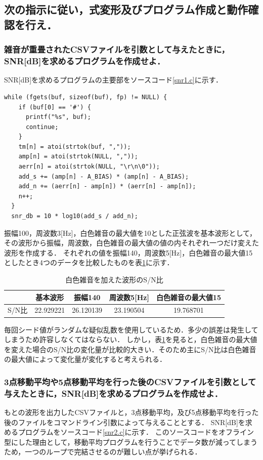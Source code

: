 \documentclass[titlepage]{jarticle}
\begin{document}
\subsection{次の指示に従い，式変形及びプログラム作成と動作確認を行え．}

\setcounter{subsubsection}{2}
\subsubsection{雑音が重畳されたCSVファイルを引数として与えたときに，SNR[dB]を求めるプログラムを作成せよ．}\label{snr1}
SNR[dB]を求めるプログラムの主要部をソースコード\ref{snr1.c}に示す．
\begin{lstlisting}[caption=snr1.cの主要部,label=snr1.c]
  while (fgets(buf, sizeof(buf), fp) != NULL) {
    if (buf[0] == '#') {
      printf("%s", buf);
      continue;
    }
    tm[n] = atoi(strtok(buf, ","));
    amp[n] = atoi(strtok(NULL, ","));
    aerr[n] = atoi(strtok(NULL, "\r\n\0"));
    add_s += (amp[n] - A_BIAS) * (amp[n] - A_BIAS);
    add_n += (aerr[n] - amp[n]) * (aerr[n] - amp[n]);
    n++;
  }
  snr_db = 10 * log10(add_s / add_n);
\end{lstlisting}
振幅100，周波数3[Hz]，白色雑音の最大値を10とした正弦波を基本波形として，その波形から振幅，周波数，白色雑音の最大値の値の内それぞれ一つだけ変えた波形を作成する．
それぞれの値を振幅140，周波数5[Hz]，白色雑音の最大値15としたとき4つのデータを比較したものを表\ref{tab:snr1}に示す．

\begin{table}[H]
  \caption{白色雑音を加えた波形のS/N比}
  \label{tab:snr1}
  \centering
  \begin{tabular}{l|cccc}\hline
          & 基本波形  & 振幅140   & 周波数5{[}Hz{]} & 白色雑音の最大値15 \\\hline\hline
    S/N比 & 22.929221 & 26.120139 & 23.190504       & 19.768701
  \end{tabular}
\end{table}

毎回シード値がランダムな疑似乱数を使用しているため．多少の誤差は発生してしまうため許容しなくてはならない．
しかし，表\ref{tab:snr1}を見ると，白色雑音の最大値を変えた場合のS/N比の変化量が比較的大きい．そのため主にS/N比は白色雑音の最大値によって変化量が変化すると考えられる．

\subsubsection{3点移動平均や5点移動平均を行った後のCSVファイルを引数として与えたときに，SNR[dB]を求めるプログラムを作成せよ．}\label{snr2}
もとの波形を出力したCSVファイルと，3点移動平均，及び5点移動平均を行った後のファイルをコマンドライン引数によって与えることとする．
SNR[dB]を求めるプログラムをソースコード\ref{snr2.c}に示す．
このソースコードをオフライン型にした理由として，移動平均プログラムを行うことでデータ数が減ってしまうため，一つのループで完結させるのが難しい点が挙げられる．
\end{document}
